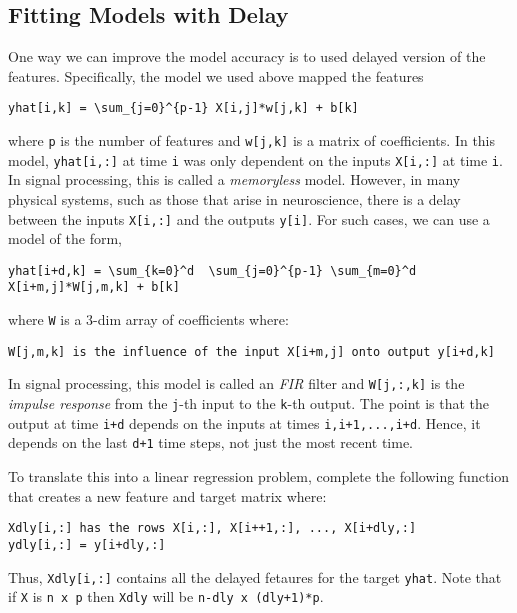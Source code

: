\documentclass[11pt]{article}
\begin{document}
    \subsection{Fitting Models with Delay}\label{fitting-models-with-delay}

One way we can improve the model accuracy is to used delayed version of
the features. Specifically, the model we used above mapped the features

\begin{verbatim}
yhat[i,k] = \sum_{j=0}^{p-1} X[i,j]*w[j,k] + b[k]
\end{verbatim}

where \texttt{p} is the number of features and \texttt{w{[}j,k{]}} is a
matrix of coefficients. In this model, \texttt{yhat{[}i,:{]}} at time
\texttt{i} was only dependent on the inputs \texttt{X{[}i,:{]}} at time
\texttt{i}. In signal processing, this is called a \emph{memoryless}
model. However, in many physical systems, such as those that arise in
neuroscience, there is a delay between the inputs \texttt{X{[}i,:{]}}
and the outputs \texttt{y{[}i{]}}. For such cases, we can use a model of
the form,

\begin{verbatim}
yhat[i+d,k] = \sum_{k=0}^d  \sum_{j=0}^{p-1} \sum_{m=0}^d X[i+m,j]*W[j,m,k] + b[k]
\end{verbatim}

where \texttt{W} is a 3-dim array of coefficients where:

\begin{verbatim}
W[j,m,k] is the influence of the input X[i+m,j] onto output y[i+d,k]
\end{verbatim}

In signal processing, this model is called an \emph{FIR} filter and
\texttt{W{[}j,:,k{]}} is the \emph{impulse response} from the
\texttt{j}-th input to the \texttt{k}-th output. The point is that the
output at time \texttt{i+d} depends on the inputs at times
\texttt{i,i+1,...,i+d}. Hence, it depends on the last \texttt{d+1} time
steps, not just the most recent time.

To translate this into a linear regression problem, complete the
following function that creates a new feature and target matrix where:

\begin{verbatim}
Xdly[i,:] has the rows X[i,:], X[i++1,:], ..., X[i+dly,:]
ydly[i,:] = y[i+dly,:]
\end{verbatim}

Thus, \texttt{Xdly{[}i,:{]}} contains all the delayed fetaures for the
target \texttt{yhat}. Note that if \texttt{X} is \texttt{n\ x\ p} then
\texttt{Xdly} will be \texttt{n-dly\ x\ (dly+1)*p}.
\end{document}
